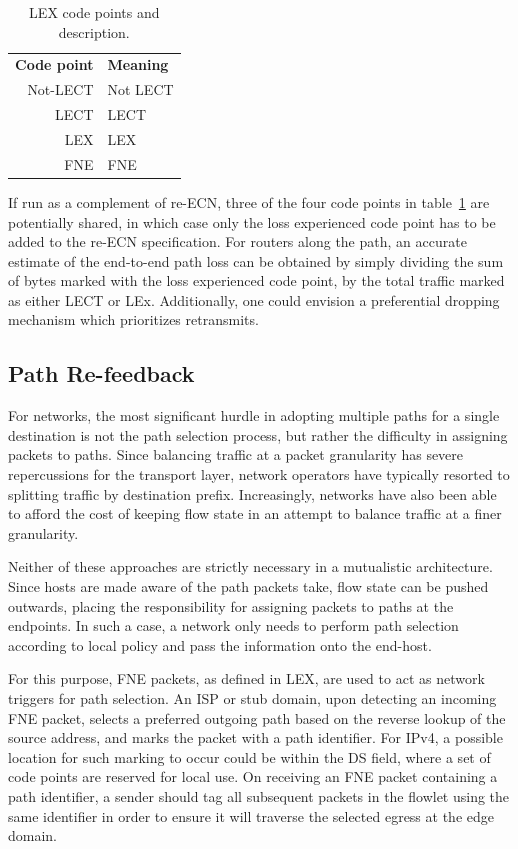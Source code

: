 \begin{table}
\centering
\begin{tabular}{r|l}
    \textbf{Code point} & \textbf{Meaning} \\
    Not-\acs{LECT} & Not \acf{LECT} \\
    \acs{LECT} & \acf{LECT} \\
    \acs{LEX} & \acf{LEX} \\ 
    \acs{FNE} & \acf{FNE} \\
\end{tabular}
\caption{LEX code points and description.}
\label{table:codepoint}
\end{table}

If run as a complement of re-\ac{ECN}, three of the four code points in table~\ref{table:codepoint} are potentially shared, in which case only the loss experienced code point has to be added to the re-\ac{ECN} specification. For routers along the path, an accurate estimate of the end-to-end path loss can be obtained by simply dividing the sum of bytes marked with the loss experienced code point, by the total traffic marked as either \ac{LECT} or \ac{LEx}. Additionally, one could envision a preferential dropping mechanism which prioritizes retransmits.

\subsection{Path Re-feedback}

For networks, the most significant hurdle in adopting multiple paths for a single destination is not the path selection process, but rather the difficulty in assigning packets to paths. Since balancing traffic at a packet granularity has severe repercussions for the transport layer, network operators have typically resorted to splitting traffic by destination prefix. Increasingly, networks have also been able to afford the cost of keeping flow state in an attempt to balance traffic at a finer granularity. 

Neither of these approaches are strictly necessary in a mutualistic architecture. Since hosts are made aware of the path packets take, flow state can be pushed outwards, placing the responsibility for assigning packets to paths at the endpoints. In such a case, a network only needs to perform path selection according to local policy and pass the information onto the end-host.

For this purpose, \ac{FNE} packets, as defined in \ac{LEX}, are used to act as network triggers for path selection. 
An \ac{ISP} or stub domain, upon detecting an incoming \ac{FNE} packet, selects a preferred outgoing path based on the reverse lookup of the source address, and marks the packet with a path identifier. 
For \ac{IPv4}, a possible location for such marking to occur could be within the \ac{DS} field, where a set of code points are reserved for local use. 
On receiving an \ac{FNE} packet containing a path identifier, a sender should tag all subsequent packets in the flowlet using the same identifier in order to ensure it will traverse the selected egress at the edge domain.

